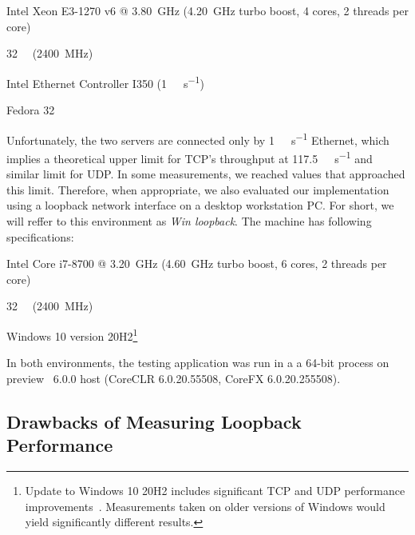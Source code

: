 \begin{itemize}

         Intel\textsuperscript{\textregistered{}} Xeon\textsuperscript{\textregistered{}}
E3-1270 v6 @ \SI{3.80}{\giga\hertz} (\SI{4.20}{\giga\hertz} turbo boost, 4 cores, 2 threads per
core)

         \SI{32}{\giga\byte} (\SI{2400}{\mega\hertz})

         Intel\textsuperscript{\textregistered{}} Ethernet Controller
I350 (\SI[per-mode=symbol]{1}{\giga\bit\per\second})

         Fedora 32

\end{itemize}

Unfortunately, the two servers are connected only by \SI[per-mode=symbol]{1}{\giga\bit\per\second}
Ethernet, which implies a theoretical upper limit for TCP's throughput at
\SI[per-mode=symbol]{117.5}{\mega\byte\per\second} and similar limit for UDP\@. In some
measurements, we reached values that approached this limit. Therefore, when appropriate, we also
evaluated our implementation using a loopback network interface on a desktop workstation PC\@. For
short, we will reffer to this environment as \textit{Win loopback}. The machine has following
specifications:

\begin{itemize}

         Intel\textsuperscript{\textregistered{}} Core\textsuperscript{\textregistered{}}
i7-8700 @ \SI{3.20}{\giga\hertz} (\SI{4.60}{\giga\hertz} turbo boost, 6 cores, 2 threads per core)

         \SI{32}{\giga\byte} (\SI{2400}{\mega\hertz})

         Windows 10 version 20H2\footnote{Update to Windows 10 20H2 includes significant
TCP and UDP performance improvements~\cite{theregister20h2}. Measurements taken on older versions of
Windows would yield significantly different results.}

\end{itemize}

In both environments, the testing application was run in a a 64-bit process on preview
\dotnet{}~6.0.0 host (CoreCLR 6.0.20.55508, CoreFX 6.0.20.255508).

\subsection{Drawbacks of Measuring Loopback Performance}\label{sec:04-localhost-mtu}

